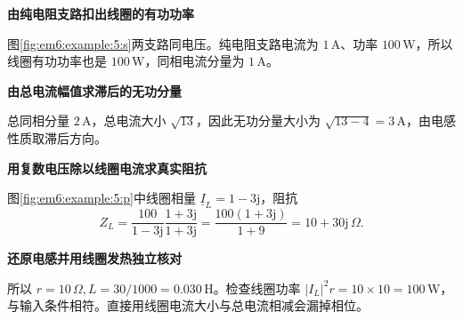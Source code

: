 \begin{solution}\textbf{由纯电阻支路扣出线圈的有功功率}\par\nobreak
图\ref{fig:em6:example:5:s}两支路同电压。纯电阻支路电流为 $1\,\mathrm A$、功率 $100\,\mathrm W$，所以线圈有功功率也是 $100\,\mathrm W$，同相电流分量为 $1\,\mathrm A$。

\par\medskip{}\noindent\textbf{由总电流幅值求滞后的无功分量}\par\nobreak
总同相分量 $2\,\mathrm A$，总电流大小 $\sqrt{13}$，因此无功分量大小为 $\sqrt{13-4}=3\,\mathrm A$，由电感性质取滞后方向。



\par\medskip{}\noindent\textbf{用复数电压除以线圈电流求真实阻抗}\par\nobreak
图\ref{fig:em6:example:5:p}中线圈相量 $\underline I_L=1-3\mathrm j$，阻抗
\[Z_L=\frac{100}{1-3\mathrm j}\frac{1+3\mathrm j}{1+3\mathrm j}=\frac{100(1+3\mathrm j)}{1+9}=10+30\mathrm j\,\Omega.\]


\par\medskip{}\noindent\textbf{还原电感并用线圈发热独立核对}\par\nobreak
所以 $r=10\,\Omega,L=30/1000=0.030\,\mathrm H$。检查线圈功率 $|I_L|^2r=10\times10=100\,\mathrm W$，与输入条件相符。直接用线圈电流大小与总电流相减会漏掉相位。\end{solution}
